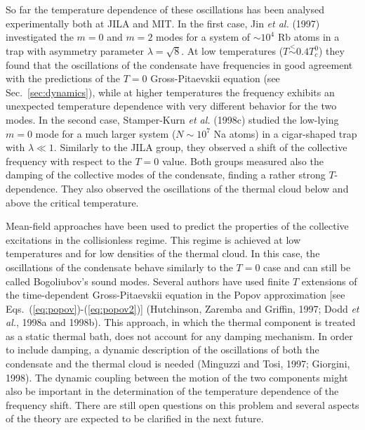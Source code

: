 So far the temperature dependence of these 
oscillations has been analysed experimentally both at JILA and MIT. 
In the first case, Jin {\it et al.} (1997) investigated the $m=0$ 
and $m=2$ modes for a system of $\sim 10^4$ Rb atoms in a trap with 
asymmetry parameter $\lambda=\sqrt{8}$. At low temperatures 
($T\stackrel{<}{\sim}0.4 T_c^0$) they found that the oscillations of 
the condensate have frequencies in good agreement with the predictions 
of the  $T=0$ Gross-Pitaevskii equation (see Sec.~\ref{sec:dynamics}), 
while at higher temperatures the frequency exhibits an unexpected 
temperature dependence with very different 
behavior for the two modes. In the second case, Stamper-Kurn {\it et al.} 
(1998c) studied the low-lying $m=0$ mode for a much larger system ($N\sim 
10^7$ Na atoms) in a cigar-shaped trap with $\lambda \ll 1$. Similarly
to the JILA group, they observed a shift of the collective frequency 
with respect to the $T=0$ value. Both groups measured also  the
damping of the collective modes of the condensate, finding a rather 
strong $T$-dependence. They also observed the oscillations of the 
thermal cloud below and above the critical temperature. 

Mean-field approaches have been used to predict the properties of the 
collective excitations in the collisionless regime. This regime is achieved 
at low temperatures and for low densities of the thermal cloud. In this case, 
the oscillations of the condensate behave similarly to the $T=0$ case and can 
still be called Bogoliubov's sound modes.  Several authors have used 
finite $T$ extensions of the time-dependent Gross-Pitaevskii equation
in the  Popov approximation [see Eqs.~(\ref{eq:popov})-(\ref{eq:popov2})]
(Hutchinson, Zaremba and Griffin, 1997; Dodd {\it et al.}, 1998a and 1998b).
This approach, in which  the thermal component  is treated as a static
thermal bath,  does not account for any damping mechanism. In order to
include damping, a dynamic description of the oscillations of both the 
condensate and the thermal cloud is needed (Minguzzi and Tosi, 
1997; Giorgini, 1998). The dynamic coupling between the motion of the two
components might also be important in the determination of the temperature
dependence of the frequency shift. There are still open questions on 
this problem and several aspects of the theory are expected to be 
clarified in the next future.  

